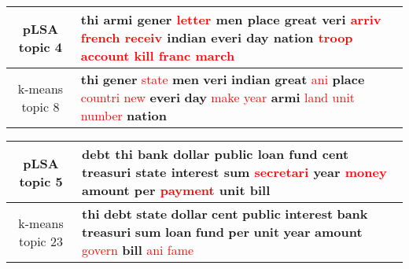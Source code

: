 \begin{center}\begin{tabularx}{\textwidth} {
  | c | >{\raggedright\arraybackslash}X | } \hline 
pLSA topic 4 & \textbf{thi} \textbf{armi} \textbf{gener} \textcolor{red}{letter} \textbf{men} \textbf{place} \textbf{great} \textbf{veri} \textcolor{red}{arriv} \textcolor{red}{french} \textcolor{red}{receiv} \textbf{indian} \textbf{everi} \textbf{day} \textbf{nation} \textcolor{red}{troop} \textcolor{red}{account} \textcolor{red}{kill} \textcolor{red}{franc} \textcolor{red}{march} \\ \hline 
k-means topic 8 & \textbf{thi} \textbf{gener} \textcolor{red}{state} \textbf{men} \textbf{veri} \textbf{indian} \textbf{great} \textcolor{red}{ani} \textbf{place} \textcolor{red}{countri} \textcolor{red}{new} \textbf{everi} \textbf{day} \textcolor{red}{make} \textcolor{red}{year} \textbf{armi} \textcolor{red}{land} \textcolor{red}{unit} \textcolor{red}{number} \textbf{nation} \\ \hline 
\end{tabularx}

\end{center}

\begin{center}\begin{tabularx}{\textwidth} {
  | c | >{\raggedright\arraybackslash}X | } \hline 
pLSA topic 5 & \textbf{debt} \textbf{thi} \textbf{bank} \textbf{dollar} \textbf{public} \textbf{loan} \textbf{fund} \textbf{cent} \textbf{treasuri} \textbf{state} \textbf{interest} \textbf{sum} \textcolor{red}{secretari} \textbf{year} \textcolor{red}{money} \textbf{amount} \textbf{per} \textcolor{red}{payment} \textbf{unit} \textbf{bill} \\ \hline 
k-means topic 23 & \textbf{thi} \textbf{debt} \textbf{state} \textbf{dollar} \textbf{cent} \textbf{public} \textbf{interest} \textbf{bank} \textbf{treasuri} \textbf{sum} \textbf{loan} \textbf{fund} \textbf{per} \textbf{unit} \textbf{year} \textbf{amount} \textcolor{red}{govern} \textbf{bill} \textcolor{red}{ani} \textcolor{red}{fame} \\ \hline 
\end{tabularx}

\end{center}

